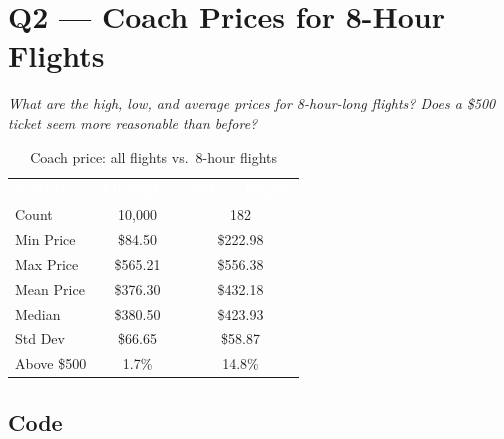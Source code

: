 \documentclass[12pt, a4paper]{report}
\newcommand{\thead}[1]{\cellcolor{themeHeaderBg}\textcolor{white}{\textbf{#1}}}
\newcommand{\talt}{\rowcolor{themeRowAlt}}
\newcommand{\trow}{\rowcolor{white}}
\begin{document}
\chapter{Q2 — Coach Prices for 8-Hour Flights}

\textit{What are the high, low, and average prices for 8-hour-long flights? Does a \$500 ticket seem more reasonable than before?}

\begin{table}[H]
\centering
\renewcommand{\arraystretch}{1.3}
\begin{tabular}{lcc}
\thead{Statistic} & \thead{All Flights} & \thead{8-Hour Flights} \\
\talt Count       & 10,000  & 182 \\
\trow Min Price   & \$84.50  & \$222.98 \\
\talt Max Price   & \$565.21 & \$556.38 \\
\trow Mean Price  & \$376.30 & \$432.18 \\
\talt Median      & \$380.50 & \$423.93 \\
\trow Std Dev     & \$66.65  & \$58.87 \\
\talt Above \$500 & 1.7\%    & 14.8\% \\
\end{tabular}
\caption{Coach price: all flights vs.\ 8-hour flights}
\end{table}

\section{Code}
\end{document}
